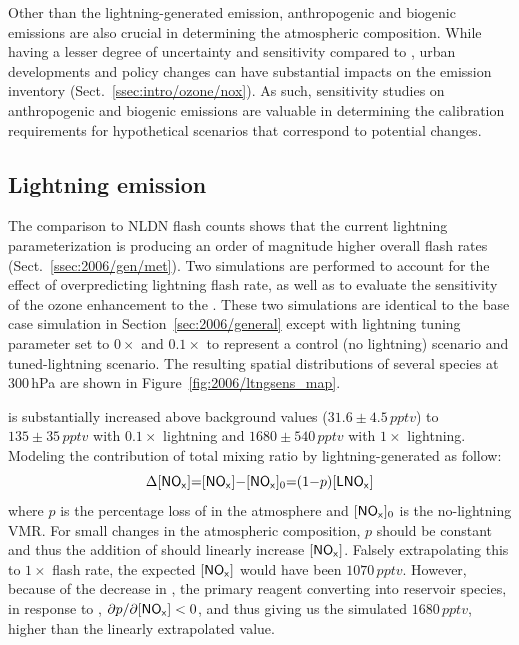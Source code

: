 Other than the lightning-generated  emission, anthropogenic and biogenic emissions are also crucial in determining the atmospheric composition. While having a lesser
degree of uncertainty and sensitivity compared to {\lnox}, urban developments and policy changes can have substantial impacts on the emission inventory
(Sect.~\ref{ssec:intro/ozone/nox}). As such, sensitivity studies on anthropogenic and biogenic emissions are valuable in determining the calibration
requirements for hypothetical scenarios that correspond to potential changes.

\subsection{Lightning emission}\label{ssec:2006/sens/lnox}

The comparison to NLDN flash counts shows that the current lightning parameterization is producing an order of magnitude higher overall flash rates
(Sect.~\ref{ssec:2006/gen/met}). Two simulations are performed to account for the effect of overpredicting lightning flash rate, as well as to evaluate
the sensitivity of the ozone enhancement to the {\lnox}. These two simulations are identical to the base case simulation in Section~\ref{sec:2006/general}
except with lightning tuning parameter set to $0\times$ and $0.1\times$ to represent a control (no lightning) scenario and tuned-lightning scenario. The
resulting spatial distributions of several species at 300\,\unit{hPa} are shown in Figure~\ref{fig:2006/ltngsens_map}.


 is substantially increased above background values ($31.6\pm4.5\,\unit{pptv}$) to $135\pm35\,\unit{pptv}$ with $0.1\times$ lightning and
$1680\pm540\,\unit{pptv}$ with $1\times$ lightning. Modeling the contribution of total  mixing ratio by lightning-generated  as follow:
\begin{equation}\label{eqn:nox+lnox}
	\Delta[\chem{NO_x}] = [\chem{NO_x}]-[\chem{NO_x}]_0 = (1-p)[\chem{LNO_x}]
\end{equation}
where $p$ is the percentage loss of {\lnox} in the atmosphere and $[\chem{NO_x}]_0$ is the no-lightning  VMR. For small changes in the
atmospheric composition, $p$ should be constant and thus the addition of {\lnox} should linearly increase $[\chem{NO_x}]$. Falsely extrapolating this
to $1\times$ flash rate, the expected $[\chem{NO_x}]$ would have been $1070\,\unit{pptv}$. However, because of the decrease in , the
primary reagent converting  into reservoir species, in response to {\lnox}, $\partial p/\partial [\chem{NO_x}] < 0$, and thus giving us the
simulated $1680\,\unit{pptv}$, higher than the linearly extrapolated value.

